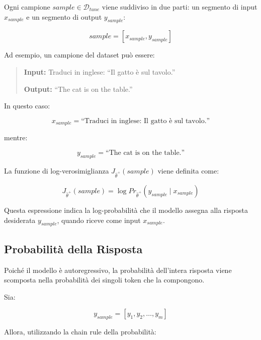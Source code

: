 Ogni campione $sample \in \mathcal{D}_{tune}$ viene suddiviso in due parti: un segmento di input $x_{sample}$ e un segmento di output $y_{sample}$:

\begin{equation}
sample = [x_{sample}, y_{sample}]
\tag{2.17}
\end{equation}

Ad esempio, un campione del dataset può essere:

\begin{quote}
\textbf{Input:} Traduci in inglese: ``Il gatto è sul tavolo.''

\textbf{Output:} ``The cat is on the table.''
\end{quote}

In questo caso:

\begin{equation}
x_{sample}
=
\text{``Traduci in inglese: Il gatto è sul tavolo.''}
\end{equation}

mentre:

\begin{equation}
y_{sample}
=
\text{``The cat is on the table.''}
\end{equation}

La funzione di log-verosimiglianza $J_{\hat{\theta}^+}(sample)$ viene definita come:

\begin{equation}
J_{\hat{\theta}^+}(sample)
=
\log Pr_{\hat{\theta}^+}(y_{sample} \mid x_{sample})
\tag{2.18}
\end{equation}

Questa espressione indica la log-probabilità che il modello assegna alla
risposta desiderata $y_{sample}$, quando riceve come input
$x_{sample}$.

\subsection*{Probabilità della Risposta}

Poiché il modello è autoregressivo, la probabilità dell'intera risposta
viene scomposta nella probabilità dei singoli token che la compongono.

Sia:

\begin{equation}
y_{sample}
=
[y_1,y_2,\dots,y_m]
\end{equation}

Allora, utilizzando la chain rule della probabilità:

